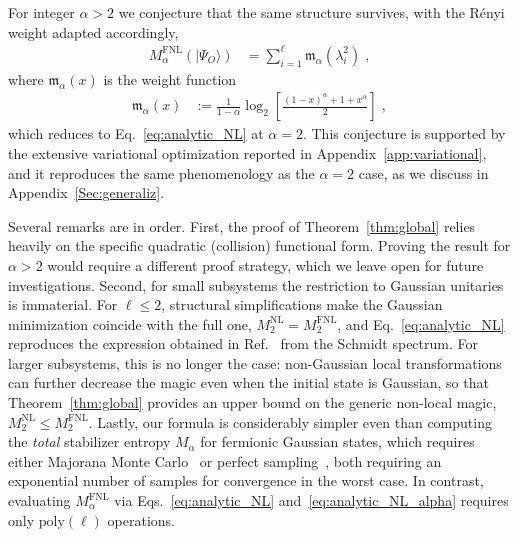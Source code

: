 \documentclass[prx,twocolumn,superscriptaddress,aps,10pt, frontmatterverbose, reprint,footinbib,longbibliography=true]{revtex4-2}
\newcommand{\RENYI}{\alpha}
\begin{document}
For integer $\RENYI>2$ we conjecture that the same structure survives, with the R\'enyi weight adapted accordingly,
    \begin{equation} 
    \begin{split}
      M_{\RENYI}^{\mathrm{FNL}}(|\Psi_O\rangle)\! &= \sum_{i=1}^{\ell}\mathfrak{m}_\RENYI(\lambda_i^2)\;,
    \end{split}
    \label{eq:analytic_NL_alpha}
    \end{equation}
\noindent
where $\mathfrak{m}_\RENYI(x)$ is the weight function
\begin{equation}
    \begin{split}
      \mathfrak{m}_\RENYI(x)&:=
    \frac{1}{1-\RENYI}\log_2\! \left[\frac{\left(1-x \right)^{\RENYI }\!\!+1+ x^{ \RENYI }}{2} \right]\;, 
    \end{split}
    \label{eq:analytic_NL_weights}
    \end{equation}
which reduces to Eq.~\eqref{eq:analytic_NL} at $\RENYI=2$. This conjecture is supported by the extensive variational optimization reported in Appendix~\ref{app:variational}, and it reproduces the same phenomenology as the $\RENYI=2$ case, as we discuss in Appendix~\ref{Sec:generaliz}.

Several remarks are in order.
First, the proof of Theorem~\ref{thm:global} relies heavily on the specific quadratic (collision) functional form. Proving the result for $\RENYI>2$ would require a different proof strategy, which we leave open for future investigations.
Second, for small subsystems the restriction to Gaussian unitaries is immaterial. For $\ell\le 2$, structural simplifications make the Gaussian minimization coincide with the full one, $M_2^{\mathrm{NL}}=M_2^{\mathrm{FNL}}$, and Eq.~\eqref{eq:analytic_NL} reproduces the expression obtained in Ref.~\cite{Cao_2025} from the Schmidt spectrum. For larger subsystems, this is no longer the case: non-Gaussian local transformations can further decrease the magic even when the initial state is Gaussian, so that Theorem~\ref{thm:global} provides an upper bound on the generic non-local magic, $M_2^{\mathrm{NL}}\le M_2^{\mathrm{FNL}}$.
Lastly, our formula is considerably simpler even than computing the \emph{total} stabilizer entropy $M_\RENYI$ for fermionic Gaussian states, which requires either Majorana Monte Carlo~\cite{Bera_2025} or perfect sampling~\cite{collura2026nonstabilizernessfermionicgaussianstates}, both requiring an exponential number of samples for convergence in the worst case. In contrast, evaluating $M_\RENYI^\mathrm{FNL}$ via Eqs.~\eqref{eq:analytic_NL} and~\eqref{eq:analytic_NL_alpha} requires only $\mathrm{poly}(\ell)$ operations.
\end{document}
